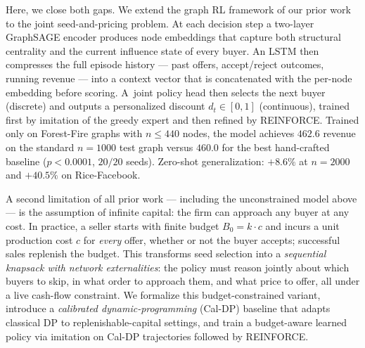 Here, we close both gaps.
We extend the graph RL framework of our prior work~\citep{anon_wsdm27} to the
joint seed-and-pricing problem.
At each decision step a two-layer GraphSAGE encoder produces node embeddings
that capture both structural centrality and the current influence state of
every buyer.
An LSTM then compresses the full episode history — past offers, accept/reject
outcomes, running revenue — into a context vector that is concatenated with
the per-node embedding before scoring.
A~joint policy head then selects the next buyer (discrete) and outputs a
personalized discount $d_t \in [0,1]$ (continuous), trained first by imitation
of the \citet{babaei2013revenue} greedy expert and then refined by REINFORCE.
Trained only on Forest-Fire graphs with $n \le 440$ nodes, the model achieves
$462.6$ %
revenue on the standard $n{=}1000$ test graph versus $460.0$ for the best
hand-crafted baseline ($p{<}0.0001$, %
$20/20$ seeds).
Zero-shot generalization: $+8.6\%$ at $n{=}2000$ %
and $+40.5\%$ on Rice-Facebook. %

A second limitation of all prior work — including the unconstrained model
above — is the assumption of infinite capital: the firm can approach any buyer
at any cost.
In practice, a seller starts with finite budget $B_0 = k \cdot c$ and incurs a
unit production cost $c$ for \emph{every} offer, whether or not the buyer
accepts; successful sales replenish the budget.
This transforms seed selection into a \emph{sequential knapsack with network
externalities}: the policy must reason jointly about which buyers to skip,
in what order to approach them, and what price to offer, all under a live
cash-flow constraint.
We formalize this budget-constrained variant, introduce a
\emph{calibrated dynamic-programming} (Cal-DP) baseline that adapts classical
DP to replenishable-capital settings, and train a budget-aware learned policy
via imitation on Cal-DP trajectories followed by REINFORCE.


